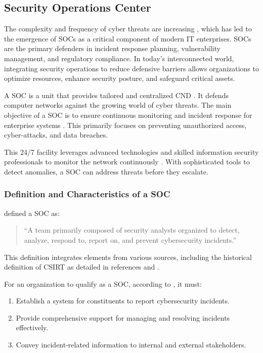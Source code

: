 \subsection{Security Operations Center} 

The complexity and frequency of cyber threats are increasing \parencite{Arianna2024}, which has led to the emergence of \gls{SOC}s as a critical component of modern IT enterprises. 
\gls{SOC}s are the primary defenders in incident response planning, vulnerability management, and regulatory compliance. 
In today's interconnected world, integrating security operations to reduce defensive barriers allows organizations to optimize resources, enhance security posture, and safeguard critical assets.

A \gls{SOC} is a unit \parencite{Rutledge2024} that provides tailored and centralized \gls{CND} \parencite{Zimmerman2014}. 
It defends computer networks against the growing world of cyber threats. 
The main objective of a \gls{SOC} is to ensure continuous monitoring and incident response for enterprise systems \parencite{Zimmerman2014}. 
This primarily focuses on preventing unauthorized access, cyber-attacks, and data breaches.

This \gls{24/7} facility leverages advanced technologies and skilled information security professionals to monitor the network continuously \parencite{Zimmerman2014}. 
With sophisticated tools to detect anomalies, a \gls{SOC} can address threats before they escalate.

\subsubsection{Definition and Characteristics of a SOC}
\textcite{Zimmerman2014} defined a \gls{SOC} as:
\begin{quote}
    ``A team primarily composed of security analysts organized to detect, analyze, respond to, report on, and prevent cybersecurity incidents.''
\end{quote}

This definition integrates elements from various sources, including the historical definition of \gls{CSIRT} as detailed in references \parencite{Shirey2007} and \parencite{Brownlee1998}. 

For an organization to qualify as a \gls{SOC}, according to \textcite{Zimmerman2014}, it must:
\begin{enumerate}
    \item Establish a system for constituents to report cybersecurity incidents.
    \item Provide comprehensive support for managing and resolving incidents effectively.
    \item Convey incident-related information to internal and external stakeholders.
\end{enumerate}

